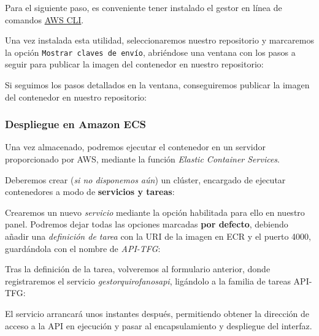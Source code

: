 Para el siguiente paso, es conveniente tener instalado el gestor en línea de comandos \href{https://docs.aws.amazon.com/es_es/cli/latest/userguide/getting-started-install.html}{AWS CLI}.

Una vez instalada esta utilidad, seleccionaremos nuestro repositorio y marcaremos la opción \texttt{Mostrar claves de envío}, abriéndose una ventana con los pasos a seguir para publicar la imagen del contenedor en nuestro repositorio:


Si seguimos los pasos detallados en la ventana, conseguiremos publicar la imagen del contenedor en nuestro repositorio:


\subsubsection{Despliegue en Amazon ECS}

Una vez almacenado, podremos ejecutar el contenedor en un servidor proporcionado por AWS, mediante la función \textit{Elastic Container Services}.

Deberemos crear (\textit{si no disponemos aún}) un clúster, encargado de ejecutar contenedores a modo de \textbf{servicios y tareas}:



Crearemos un nuevo \textit{servicio} mediante la opción habilitada para ello en nuestro panel. Podremos dejar todas las opciones marcadas \textbf{por defecto}, debiendo añadir una \textit{definición de tarea} con la URI de la imagen en ECR y el puerto 4000, guardándola con el nombre de \textit{API-TFG}:


Tras la definición de la tarea, volveremos al formulario anterior, donde registraremos el servicio \textit{gestorquirofanosapi}, ligándolo a la familia de tareas API-TFG:


El servicio arrancará unos instantes después, permitiendo obtener la dirección de acceso a la API en ejecución y pasar al encapsulamiento y despliegue del interfaz.

